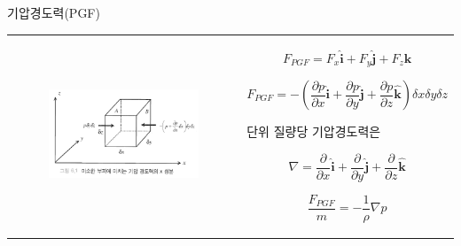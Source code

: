 \begin{frame}[t]{기압경도력(PGF)}
	\begin{tabular}{ll}
		\begin{minipage}[t]{0.45\textwidth}\scriptsize
			\begin{figure}[t]
				\includegraphics[width=\textwidth]{./images/PGF1}
			\end{figure}         
			
		\end{minipage}	                  
		&
		\begin{minipage}[t]{0.5\textwidth} \scriptsize	
			
			
			$${\displaystyle	{
					F_{PGF}=F_{x} \boldsymbol{\hat{i}}+{F}_{y} \boldsymbol{\hat{j}}+{F}_{z} \boldsymbol{\hat{k}}
			}	}	$$
			
			
			$${\displaystyle	{
					F_{PGF}=-\left(\frac{\partial p}{\partial x} \boldsymbol{\hat{i}}+\frac{\partial p}{\partial y} \boldsymbol{\hat{j}}+\frac{\partial p}{\partial z} \boldsymbol{\hat{k}}\right) \delta x \delta  y \delta  z
			}	}$$
			
			단위 질량당 기압경도력은 
			
			$${\displaystyle	{
					\nabla=\frac{\partial}{\partial x} \boldsymbol{\hat i}+\frac{\partial}{\partial y} \boldsymbol{\hat j}+\frac{\partial}{\partial z} \boldsymbol{\hat k}
			}	}$$
			
			$${\displaystyle	{
					\frac{F_{PGF}}{m}=-\frac{1}{\rho} \nabla p
			}	}$$
			
			\end{minipage}
		\end{tabular}
\end{frame}
	




